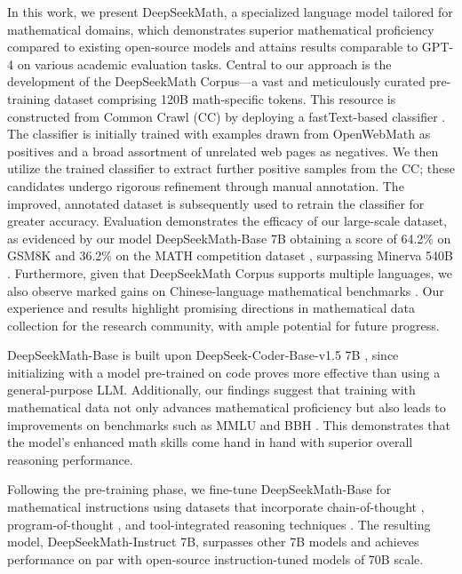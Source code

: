In this work, we present DeepSeekMath, a specialized language model tailored for mathematical domains, which demonstrates superior mathematical proficiency compared to existing open-source models and attains results comparable to GPT-4 on various academic evaluation tasks. Central to our approach is the development of the DeepSeekMath Corpus—a vast and meticulously curated pre-training dataset comprising 120B math-specific tokens. This resource is constructed from Common Crawl (CC) by deploying a fastText-based classifier \citep{joulin2016fasttext}. The classifier is initially trained with examples drawn from OpenWebMath \citep{openwebmath} as positives and a broad assortment of unrelated web pages as negatives. We then utilize the trained classifier to extract further positive samples from the CC; these candidates undergo rigorous refinement through manual annotation. The improved, annotated dataset is subsequently used to retrain the classifier for greater accuracy. Evaluation demonstrates the efficacy of our large-scale dataset, as evidenced by our model DeepSeekMath-Base 7B obtaining a score of 64.2\% on GSM8K \citep{gsm8k} and 36.2\% on the MATH competition dataset \citep{MATH}, surpassing Minerva 540B \citep{minerva}. Furthermore, given that DeepSeekMath Corpus supports multiple languages, we also observe marked gains on Chinese-language mathematical benchmarks \citep{wei2023cmath,agieval}. Our experience and results highlight promising directions in mathematical data collection for the research community, with ample potential for future progress.

DeepSeekMath-Base is built upon DeepSeek-Coder-Base-v1.5 7B \citep{deepseek-coder}, since initializing with a model pre-trained on code proves more effective than using a general-purpose LLM. Additionally, our findings suggest that training with mathematical data not only advances mathematical proficiency but also leads to improvements on benchmarks such as MMLU \citep{mmlu} and BBH \citep{bbh}. This demonstrates that the model's enhanced math skills come hand in hand with superior overall reasoning performance.

Following the pre-training phase, we fine-tune DeepSeekMath-Base for mathematical instructions using datasets that incorporate chain-of-thought \citep{cot}, program-of-thought \citep{pot,pal}, and tool-integrated reasoning techniques \citep{tora}. The resulting model, DeepSeekMath-Instruct 7B, surpasses other 7B models and achieves performance on par with open-source instruction-tuned models of 70B scale.

